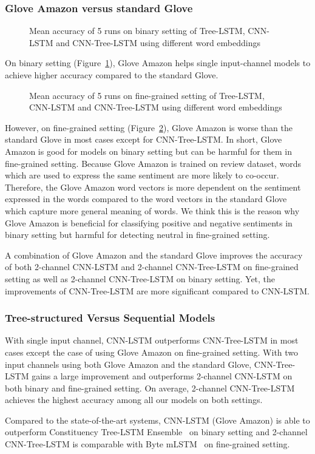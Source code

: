 \subsubsection{Glove Amazon versus standard Glove}
\begin{figure} []
	\centering
	
	\caption[qwerty]{Mean accuracy of 5 runs on binary setting of Tree-LSTM, CNN-LSTM and CNN-Tree-LSTM using different word embeddings}
	\label{graph:binary}
\end{figure}
On binary setting (Figure~\ref{graph:binary}), Glove Amazon helps single input-channel models to achieve higher accuracy compared to the standard Glove.
\begin{figure} []
	\centering
	
	\caption[qwerty]{Mean accuracy of 5 runs on fine-grained setting of Tree-LSTM, CNN-LSTM and CNN-Tree-LSTM using different word embeddings}
	\label{graph:fine-grained}
\end{figure}
However, on fine-grained setting (Figure~\ref{graph:fine-grained}), Glove Amazon is worse than the standard Glove in most cases except for CNN-Tree-LSTM.
In short, Glove Amazon is good for models on binary setting but can be harmful for them in fine-grained setting.
Because Glove Amazon is trained on review dataset, words which are used to express the same sentiment are more likely to co-occur. 
Therefore, the Glove Amazon word vectors is more dependent on the sentiment expressed in the words compared to the word vectors in the standard Glove which capture more general meaning of words.
We think this is the reason why Glove Amazon is beneficial for classifying positive and negative sentiments in binary setting but harmful for detecting neutral in fine-grained setting. 

A combination of Glove Amazon and the standard Glove improves the accuracy of both 2-channel CNN-LSTM and 2-channel CNN-Tree-LSTM on fine-grained setting as well as 2-channel CNN-Tree-LSTM on binary setting.
Yet, the improvements of CNN-Tree-LSTM are more significant compared to CNN-LSTM.
\subsubsection{Tree-structured Versus Sequential Models}
With single input channel, CNN-LSTM outperforms CNN-Tree-LSTM in most cases except the case of using Glove Amazon on fine-grained setting.
With two input channels using both Glove Amazon and the standard Glove, CNN-Tree-LSTM gains a large improvement and outperforms 2-channel CNN-LSTM on both binary and fine-grained setting.
On average, 2-channel CNN-Tree-LSTM achieves the highest accuracy among all our models on both settings.

Compared to the state-of-the-art systems, CNN-LSTM (Glove Amazon) is able to outperform Constituency Tree-LSTM Ensemble~\cite{LooksHHN17} on binary setting and 2-channel CNN-Tree-LSTM is comparable with Byte mLSTM~\cite{mlstm} on fine-grained setting.